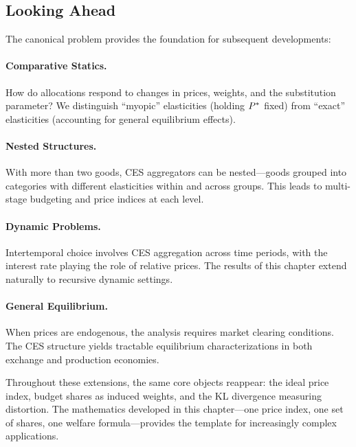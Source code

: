 \subsection{Looking Ahead}
\label{subsec:summary-ahead}

The canonical problem provides the foundation for subsequent developments:

\paragraph{Comparative Statics.}
How do allocations respond to changes in prices, weights, and the substitution parameter? We distinguish ``myopic'' elasticities (holding $P^{*}$ fixed) from ``exact'' elasticities (accounting for general equilibrium effects).

\paragraph{Nested Structures.}
With more than two goods, CES aggregators can be nested---goods grouped into categories with different elasticities within and across groups. This leads to multi-stage budgeting and price indices at each level.

\paragraph{Dynamic Problems.}
Intertemporal choice involves CES aggregation across time periods, with the interest rate playing the role of relative prices. The results of this chapter extend naturally to recursive dynamic settings.

\paragraph{General Equilibrium.}
When prices are endogenous, the analysis requires market clearing conditions. The CES structure yields tractable equilibrium characterizations in both exchange and production economies.

\begin{callouttip}
Throughout these extensions, the same core objects reappear: the ideal price index, budget shares as induced weights, and the KL divergence measuring distortion. The mathematics developed in this chapter---one price index, one set of shares, one welfare formula---provides the template for increasingly complex applications.
\end{callouttip}
